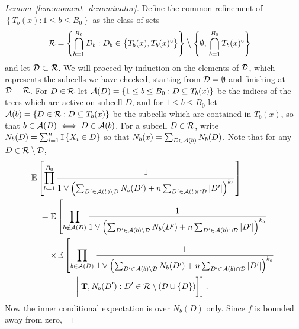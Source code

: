 \begin{proof}[Lemma~\ref{lem:moment_denominator}]

  Define the common refinement of
  $\left\{ T_b(x) : 1 \leq b \leq {B_0} \right\}$ as
  the class of sets
  \begin{align*}
    \mathcal{R}
    &= \left\{ \bigcap_{b=1}^{B_0} D_b :
      D_b \in
      \big\{ T_b(x), T_b(x)^{\mathrm{c}} \big\}
    \right\}
    \mathbin{\big\backslash}
    \left\{
      \emptyset,\,
      \bigcap_{b=1}^{B_0}
      T_b(x)^{\mathrm{c}}
    \right\}
  \end{align*}
  and let $\mathcal{D} \subset \mathcal{R}$.
  We will proceed by induction on the elements of $\mathcal{D}$,
  which represents the subcells we have checked,
  starting from $\mathcal{D} = \emptyset$ and finishing at $\mathcal{D} = \mathcal{R}$.
  For $D \in \mathcal{R}$ let
  $\mathcal{A}(D) = \left\{ 1 \leq b \leq {B_0} : D \subseteq T_b(x) \right\}$
  be the indices of the trees which are active on subcell $D$,
  and for $1 \leq b \leq {B_0}$ let
  $\mathcal{A}(b) = \left\{ D \in \mathcal{R} : D \subseteq T_b(x) \right\}$
  be the subcells which are contained in $T_b(x)$,
  so that $b \in \mathcal{A}(D) \iff D \in \mathcal{A}(b)$.
  For a subcell $D \in \mathcal{R}$,
  write $N_b(D) = \sum_{i=1}^{n} \mathbb{I} \left\{ X_i \in D \right\}$
  so that $N_b(x) = \sum_{D \in \mathcal{A}(b)} N_b(D)$.
  Note that for any $D \in \mathcal{R} \setminus \mathcal{D}$,
  \begin{align*}
    &\mathbb{E} \left[
      \prod_{b=1}^{B_0}
      \frac{1}{
        1 \vee \left(
          \sum_{D' \in \mathcal{A}(b) \setminus \mathcal{D}}
          N_b(D')
          + n \sum_{D' \in \mathcal{A}(b) \cap \mathcal{D}}
          |D'|
        \right)^{k_b}
      }
    \right] \\
    &\quad=
    \mathbb{E} \left[
      \prod_{b \notin \mathcal{A}(D)}
      \frac{1}{
        1 \vee \left(
          \sum_{D' \in \mathcal{A}(b) \setminus \mathcal{D}}
          N_b(D')
          + n \sum_{D' \in \mathcal{A}(b) \cap \mathcal{D}}
          |D'|
        \right)^{k_b}
      } \right. \\
      &\left.
      \qquad
      \times\,\mathbb{E}\left[
        \prod_{b \in \mathcal{A}(D)}
        \frac{1}{
          1 \vee \left(
            \sum_{D' \in \mathcal{A}(b) \setminus \mathcal{D}}
            N_b(D')
            + n \sum_{D' \in \mathcal{A}(b) \cap \mathcal{D}}
            |D'|
          \right)^{k_b}
        } \right.\right. \\
        &\left.\left.
        \quad\qquad\qquad\biggm|
        \mathbf{T},
        N_b(D') : D' \in \mathcal{R}
        \setminus
        (\mathcal{D} \cup \{D\})
      \right]
    \right].
  \end{align*}
  Now the inner conditional expectation is over $N_b(D)$ only.
  Since $f$ is bounded away from zero,

\end{proof}
